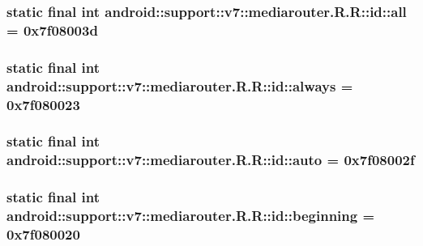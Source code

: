 \hypertarget{classandroid_1_1support_1_1v7_1_1mediarouter_1_1_r_1_1id_cf239276ed73d0ba8c90cc6d3564d538}{
\subsubsection[{all}]{\setlength{\rightskip}{0pt plus 5cm}static final int android::support::v7::mediarouter.R.R::id::all = 0x7f08003d}}
\label{classandroid_1_1support_1_1v7_1_1mediarouter_1_1_r_1_1id_cf239276ed73d0ba8c90cc6d3564d538}


\hypertarget{classandroid_1_1support_1_1v7_1_1mediarouter_1_1_r_1_1id_8d0e5f51b797cb693c505fee6806d815}{
\subsubsection[{always}]{\setlength{\rightskip}{0pt plus 5cm}static final int android::support::v7::mediarouter.R.R::id::always = 0x7f080023}}
\label{classandroid_1_1support_1_1v7_1_1mediarouter_1_1_r_1_1id_8d0e5f51b797cb693c505fee6806d815}


\hypertarget{classandroid_1_1support_1_1v7_1_1mediarouter_1_1_r_1_1id_69235a1e87058b6c93c9b0cc1f54407c}{
\subsubsection[{auto}]{\setlength{\rightskip}{0pt plus 5cm}static final int android::support::v7::mediarouter.R.R::id::auto = 0x7f08002f}}
\label{classandroid_1_1support_1_1v7_1_1mediarouter_1_1_r_1_1id_69235a1e87058b6c93c9b0cc1f54407c}


\hypertarget{classandroid_1_1support_1_1v7_1_1mediarouter_1_1_r_1_1id_586dc22dc13c545afdfd1014ef3e49bf}{
\subsubsection[{beginning}]{\setlength{\rightskip}{0pt plus 5cm}static final int android::support::v7::mediarouter.R.R::id::beginning = 0x7f080020}}
\label{classandroid_1_1support_1_1v7_1_1mediarouter_1_1_r_1_1id_586dc22dc13c545afdfd1014ef3e49bf}


